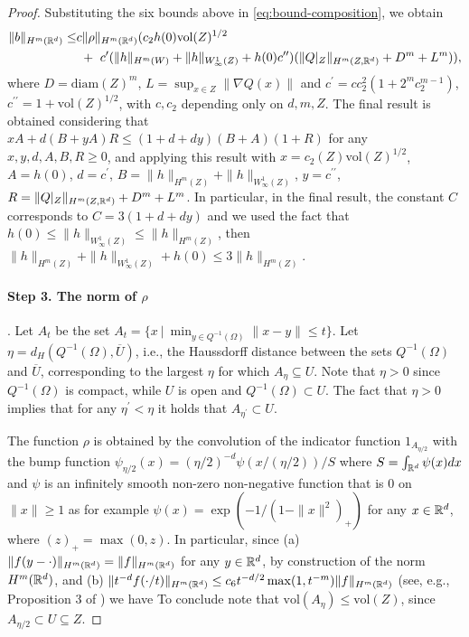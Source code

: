 \begin{proof}
{}
Substituting the six bounds above in \cref{eq:bound-composition}, we obtain
\begin{align*}
\|b\|_{H^m(\mathbb R^d)} \leq &c \|\rho\|_{H^m(\mathbb R^d)}(c_2 h(0) \textrm{vol}(Z)^{1/2}\\
& ~+~ c^\prime ( \|h\|_{H^m(W)} + \|h\|_{W^1_\infty(Z)} + h(0) c^{\prime\prime})(\|Q|_Z\|_{H^m(Z, \mathbb R^d)} + D^m + L^m)),
\end{align*}
where $D =\textrm{diam}(Z)^m $, $L = \sup_{x \in Z} \|\nabla Q (x)\|$ and $c^\prime = c c_2^2 (1 + 2^m c_2^{m-1})$, $c^{\prime\prime}=1+\textrm{vol}(Z)^{1/2}$, with $c, c_2$ depending only on $d, m, Z$.
The final result is obtained considering that $x A + d (B + y A) R \leq (1+ d + d y)(B+A)(1+R)$ for any $x,y,d,A,B, R \geq 0$, and applying this result with $x=c_2(Z)\textrm{vol}(Z)^{1/2}$, $A = h(0)$, $d = c^\prime$, $B = \|h\|_{H^m(Z)} + \|h\|_{W^1_\infty(Z)}$, $y= c^{\prime \prime}$, $R = \|Q|_Z\|_{H^m(Z, \mathbb R^d)} + D^m + L^m$. In particular, in the final result, the constant $C$ corresponds to $C = 3(1+ d + d y)$ and we used the fact that $h(0) \leq \|h\|_{W^1_\infty(Z)} \leq \|h\|_{H^m(Z)}$, then $\|h\|_{H^m(Z)} + \|h\|_{W^1_\infty(Z)} + h(0) \leq 3 \|h\|_{H^m(Z)}$.


\paragraph{Step 3. The norm of $\rho$}.  Let $A_{t}$ be the set $A_{t} = \{x ~|~ \min_{y \in Q^{-1}(\Omega)} \|x-y\| \leq t\}$. Let $\eta = d_H(Q^{-1}(\Omega), \overline{U})$, i.e., the Haussdorff distance between the sets $Q^{-1}(\Omega)$ and $\overline{U}$, corresponding to the largest $\eta$ for which $A_\eta \subseteq U$. Note that $\eta > 0$ since $Q^{-1}(\Omega)$ is compact, while $U$ is open and $Q^{-1}(\Omega) \subset U$. The fact that $\eta > 0$ implies that for any $\eta^\prime < \eta$ it holds that $A_{\eta^\prime} \subset U$.

The function $\rho$ is obtained by the convolution of the indicator function $1_{A_{\eta/2}}$ with the bump function $\psi_{\eta/2}(x) =  (\eta/2)^{-d} \psi(x/(\eta/2))/S$ where $S = \int_{\mathbb R^d} \psi(x) dx$ and $\psi$ is an infinitely smooth non-zero non-negative function that is $0$ on $\|x\| \geq 1$ as for example $\psi(x) = \exp(-1/(1-\|x\|^2)_+)$ for any $x \in \mathbb R^d$, where $(z)_+ = \max(0,z)$. In particular, since (a) $\|f(y-\cdot)\|_{H^m(\mathbb R^d)} = \|f\|_{H^m(\mathbb R^d)}$ for any $y \in \mathbb R^d$, by construction of the norm $H^m(\mathbb R^d)$, and (b) $\|t^{-d} f(\cdot/t)\|_{H^m(\mathbb R^d)} \leq c_6 t^{-d/2} \max(1,t^{-m}) \|f\|_{H^m(\mathbb R^d)}$ (see, e.g., Proposition 3 of \citealp{runst2011sobolev}) we have
To conclude note that $\textrm{vol}(A_\eta) \leq \textrm{vol}(Z)$, since $A_{\eta/2} \subset U \subseteq Z$.
\end{proof}


